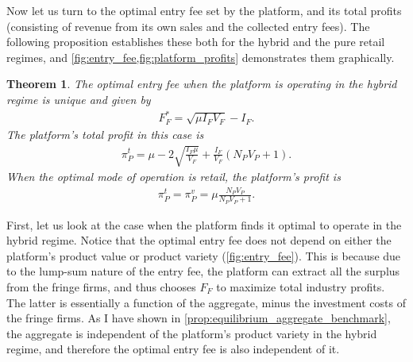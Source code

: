 \documentclass[a4paper]{article}
\newtheorem{theorem}{Theorem}
\begin{document}
Now let us turn to the optimal entry fee set by the platform, and its total profits (consisting of revenue from its own sales and the collected entry fees).
The following proposition establishes these both for the hybrid and the pure retail regimes, and \cref{fig:entry_fee,fig:platform_profits} demonstrates them graphically.

\begin{theorem}
    \label{prop:optimal_entry_fee}
    The optimal entry fee when the platform is operating in the hybrid regime is unique and given by
    \begin{align*}
        F_F^* = \sqrt{\mu I_F V_F} - I_F.
    \end{align*}
    The platform's total profit in this case is
    \begin{align*}
        \pi_P^{t} = \mu - 2\sqrt{\frac{I_F \mu}{V_F}} + \frac{I_F}{V_F} (N_P V_P + 1).
    \end{align*}
    When the optimal mode of operation is retail, the platform's profit is
    \begin{align*}
        \pi_P^{t} = \pi_P^{v} = \mu \frac{ N_P V_P}{N_P V_P + 1}.
    \end{align*}
\end{theorem}

First, let us look at the case when the platform finds it optimal to operate in the hybrid regime.
Notice that the optimal entry fee does not depend on either the platform's product value or product variety (\cref{fig:entry_fee}).
This is because due to the lump-sum nature of the entry fee, the platform can extract all the surplus from the fringe firms, and thus chooses $F_F$ to maximize total industry profits.
The latter is essentially a function of the aggregate, minus the investment costs of the fringe firms.
As I have shown in \cref{prop:equilibrium_aggregate_benchmark}, the aggregate is independent of the platform's product variety in the hybrid regime, and therefore the optimal entry fee is also independent of it.
\end{document}

